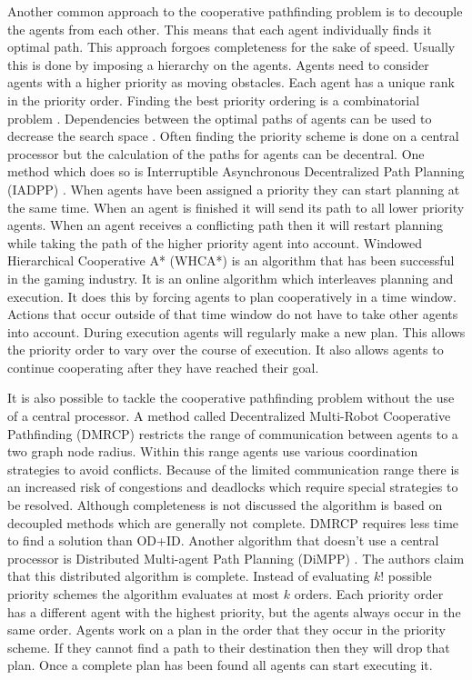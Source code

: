 Another common approach to the cooperative pathfinding problem is to decouple 
the agents from each other. This means that each agent individually finds it 
optimal path. This approach forgoes completeness for the sake of speed. 
Usually this is done by imposing a hierarchy on the agents. Agents need to 
consider agents with a higher priority as moving obstacles. Each agent has a 
unique rank in the priority order. Finding the best priority ordering is a 
combinatorial problem . Dependencies between the optimal paths of agents can be 
used to decrease the search space 
\cite{bennewitz2002}. Often finding the priority scheme is done on a central 
processor but the calculation of the paths for agents can be decentral. One 
method which does so is Interruptible Asynchronous Decentralized Path Planning 
(IADPP) \cite{cap2012}. When agents have been assigned a priority they can 
start planning at 
the same time. When an agent is finished it will send its path to all lower 
priority agents. When an agent receives a conflicting path then it will restart 
planning while taking the path of the higher priority 
agent into account. Windowed Hierarchical Cooperative A* (WHCA*) 
\cite{silver2005} is an algorithm that has been successful in the gaming 
industry. It is an online algorithm which interleaves planning and execution. 
It does this by forcing agents to plan cooperatively in a time window. Actions 
that occur outside of that time window do not have to take other agents into 
account. During execution agents will regularly make a new plan. This allows 
the priority order to vary over the course of 
execution. It also allows agents to continue cooperating after they have 
reached their goal.

It is also possible to tackle the cooperative pathfinding problem without the 
use of a central processor. A method called Decentralized Multi-Robot 
Cooperative Pathfinding (DMRCP) \cite{wei2016} restricts the 
range of communication between agents to a two graph node radius. Within this 
range agents use various coordination strategies to avoid conflicts. Because of 
the limited communication range there is an increased risk of congestions and 
deadlocks which require special strategies to be resolved. Although 
completeness is not discussed the algorithm is based on decoupled methods which 
are generally not complete. DMRCP requires less time to find a solution than 
OD+ID. Another algorithm that doesn't use a central processor is Distributed 
Multi-agent Path Planning (DiMPP) \cite{chouhan2017}. The authors claim that 
this distributed algorithm is complete. Instead of evaluating 
$k!$ possible priority schemes the algorithm evaluates at most $k$ orders. Each 
priority order has a different agent with the highest priority, but the agents 
always occur in the same order. Agents work on a plan in the order that they 
occur in the priority scheme. If they cannot find a path to their destination 
then they will drop that plan. Once a complete plan has been found all agents 
can start executing it.

